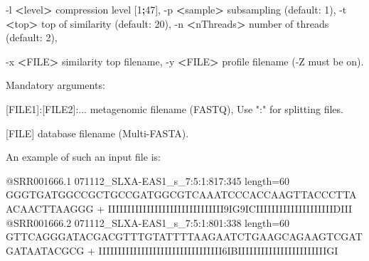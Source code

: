 \documentclass[11pt,]{krantz}
\newenvironment{Shaded}{\begin{snugshade}}{\end{snugshade}}
\newcommand{\KeywordTok}[1]{\textcolor[rgb]{0.27,0.27,0.27}{\textbf{#1}}}
\newcommand{\StringTok}[1]{\textcolor[rgb]{0.5,0.5,0.5}{#1}}
\newcommand{\OperatorTok}[1]{\textcolor[rgb]{0.43,0.43,0.43}{\textbf{#1}}}
\newcommand{\BuiltInTok}[1]{#1}
\newcommand{\ExtensionTok}[1]{#1}
\newcommand{\NormalTok}[1]{#1}
\begin{document}
\begin{Shaded}
\begin{Highlighting}[]
      \ExtensionTok{-l} \OperatorTok{<}\NormalTok{level}\OperatorTok{>}\NormalTok{           compression level [1}\KeywordTok{;}\ExtensionTok{47}\NormalTok{],                    }
      \ExtensionTok{-p} \OperatorTok{<}\NormalTok{sample}\OperatorTok{>}\NormalTok{          subsampling (default: 1),                    }
      \ExtensionTok{-t} \OperatorTok{<}\NormalTok{top}\OperatorTok{>}\NormalTok{             top of similarity (default: 20),              }
      \ExtensionTok{-n} \OperatorTok{<}\NormalTok{nThreads}\OperatorTok{>}\NormalTok{        number of threads (default: 2),              }
                                                                         
      \ExtensionTok{-x} \OperatorTok{<}\NormalTok{FILE}\OperatorTok{>}\NormalTok{            similarity top filename,                      }
      \ExtensionTok{-y} \OperatorTok{<}\NormalTok{FILE}\OperatorTok{>}\NormalTok{            profile filename (-Z must be on)}\BuiltInTok{.}             
                                                                         
      \ExtensionTok{Mandatory}\NormalTok{ arguments:                                               }
                                                                         
\NormalTok{      [}\ExtensionTok{FILE1}\NormalTok{]:[FILE2]:...  metagenomic filename (FASTQ),                 }
                           \ExtensionTok{Use} \StringTok{":"}\NormalTok{ for splitting files.                }
                                                                         
\NormalTok{      [}\ExtensionTok{FILE}\NormalTok{]               database filename (Multi-FASTA)}\BuiltInTok{.}                
\end{Highlighting}
\end{Shaded}

An example of such an input file is:

\begin{Shaded}
\begin{Highlighting}[]
\ExtensionTok{@SRR001666.1}\NormalTok{ 071112_SLXA-EAS1_s_7:5:1:817:345 length=60}
\ExtensionTok{GGGTGATGGCCGCTGCCGATGGCGTCAAATCCCACCAAGTTACCCTTAACAACTTAAGGG}
\ExtensionTok{+}
\ExtensionTok{IIIIIIIIIIIIIIIIIIIIIIIIIIIIII9IG9ICIIIIIIIIIIIIIIIIIIIIDIII}
\ExtensionTok{@SRR001666.2}\NormalTok{ 071112_SLXA-EAS1_s_7:5:1:801:338 length=60}
\ExtensionTok{GTTCAGGGATACGACGTTTGTATTTTAAGAATCTGAAGCAGAAGTCGATGATAATACGCG}
\ExtensionTok{+}
\ExtensionTok{IIIIIIIIIIIIIIIIIIIIIIIIIIIIIIII6IBIIIIIIIIIIIIIIIIIIIIIIIGI}
\end{Highlighting}
\end{Shaded}
\end{document}
